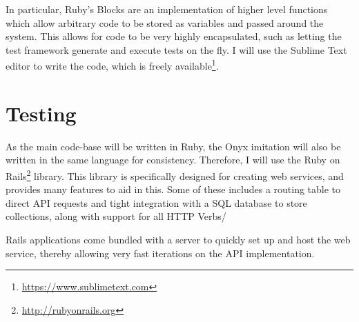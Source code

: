 In particular, Ruby's Blocks are an implementation of higher level functions which allow arbitrary code to be stored as variables and passed around the system. This allows for code to be very highly encapsulated,  such as letting the test framework generate and execute tests on the fly. I will use the Sublime Text editor to write the code, which is freely available\footnote{\url{https://www.sublimetext.com}}.

\section{Testing}

As the main code-base will be written in Ruby, the Onyx imitation will also be written in the same language for consistency. Therefore, I will use the Ruby on Rails\footnote{\url{http://rubyonrails.org}} library. This library is specifically designed for creating web services, and provides many features to aid in this. Some of these includes a routing table to direct API requests and tight integration with a SQL database to store collections, along with support for all HTTP Verbs/

Rails applications come bundled with a server to quickly set up and host the web service, thereby allowing very fast iterations on the API implementation.